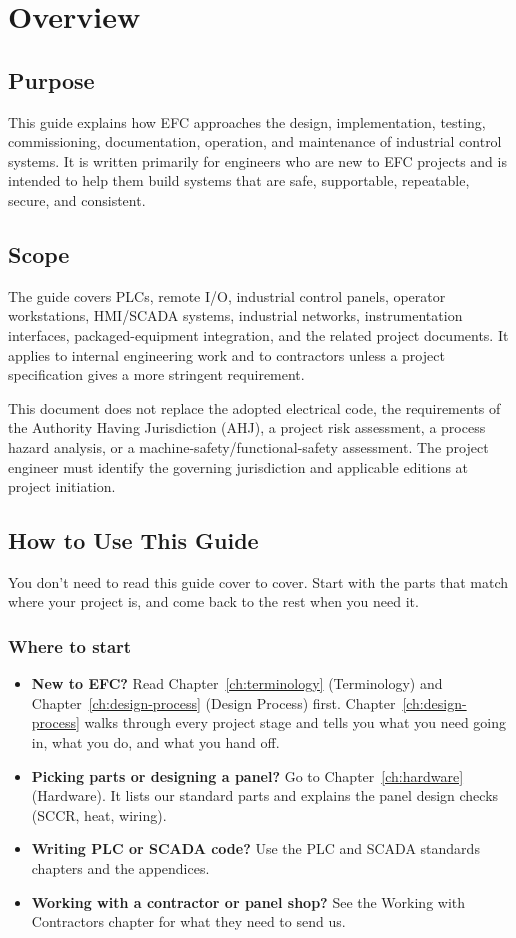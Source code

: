 \chapter{Overview}
\section{Purpose}
This guide explains how EFC approaches the design, implementation, testing, commissioning, documentation, operation, and maintenance of industrial control systems. It is written primarily for engineers who are new to EFC projects and is intended to help them build systems that are safe, supportable, repeatable, secure, and consistent.

\section{Scope}
The guide covers PLCs, remote I/O, industrial control panels, operator workstations, HMI/SCADA systems, industrial networks, instrumentation interfaces, packaged-equipment integration, and the related project documents. It applies to internal engineering work and to contractors unless a project specification gives a more stringent requirement.

This document does not replace the adopted electrical code, the requirements of the Authority Having Jurisdiction (AHJ), a project risk assessment, a process hazard analysis, or a machine-safety/functional-safety assessment. The project engineer must identify the governing jurisdiction and applicable editions at project initiation.

\section{How to Use This Guide}\label{sec:how-to-use}
You don't need to read this guide cover to cover. Start with the parts that match where your project is, and come back to the rest when you need it.

\subsection*{Where to start}
\begin{itemize}[itemsep=2pt]
  \item \textbf{New to EFC?} Read Chapter~\ref{ch:terminology} (Terminology) and Chapter~\ref{ch:design-process} (Design Process) first. Chapter~\ref{ch:design-process} walks through every project stage and tells you what you need going in, what you do, and what you hand off.
  \item \textbf{Picking parts or designing a panel?} Go to Chapter~\ref{ch:hardware} (Hardware). It lists our standard parts and explains the panel design checks (SCCR, heat, wiring).
  \item \textbf{Writing PLC or SCADA code?} Use the PLC and SCADA standards chapters and the appendices.
  \item \textbf{Working with a contractor or panel shop?} See the Working with Contractors chapter for what they need to send us.
\end{itemize}


